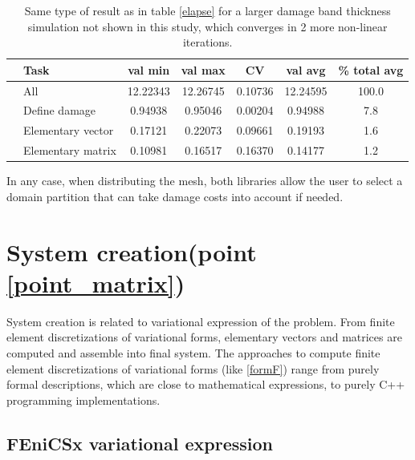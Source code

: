 \documentclass[12pt]{article}
\newcommand{\f}[1]{FEniCSx#1}
\begin{document}
\begin{table}\footnotesize 
	\begin{tabular}{|c|l|c|c|c|c|c|}
		\cline{2-7}
		\multicolumn{1}{c|}{} & Task & val min & val max &CV& val avg & \% total avg \\ \hline
		\multirow{4}{*}{\rotatebox{90}{ MFEM}}      &  All & 12.22343 & 12.26745& 0.10736 & 12.24595 & 100.0 \\ \cline{2-7} 
		&  Define damage & 0.94938 & 0.95046 &0.00204& 0.94988 & 7.8 \\  \cline{2-7} 
		&  Elementary vector & 0.17121   & 0.22073  & 0.09661 &      0.19193 &          1.6 \\ \cline{2-7} 
		&  Elementary matrix & 0.10981  &  0.16517 & 0.16370& 0.14177 & 1.2 \\ \hline
	\end{tabular}
	\caption{Same type of result as in table \ref{elapse} for a larger damage band thickness simulation not shown in this study, which converges in 2 more non-linear iterations.\label{elapse_large}}
\end{table}
  
In any case, when distributing the mesh, both libraries allow the user to select a domain partition that can take damage costs into account if needed.
\section{System creation(point \ref{point_matrix})\label{systemcreation}}
System creation is related to variational expression of the problem. From finite element discretizations of variational forms, elementary vectors and matrices are computed and assemble into final system.
The approaches to compute finite element discretizations of variational forms (like \eqref{formF}) range from purely formal descriptions, which are close to mathematical expressions, to purely C++ programming implementations.

\subsection{\f{} variational expression \label{Fenicx_form}}
\end{document}
